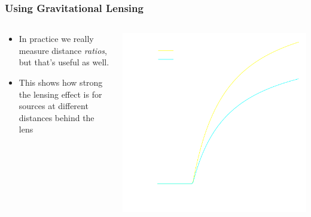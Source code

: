 \documentclass{beamer}
\begin{document}
{\begin{columns}
\begin{column}{0.5\textwidth}
            
        \end{column}
    \end{columns}


}

\frame
{

    \frametitle{Using Gravitational Lensing}


    \begin{columns}
        \begin{column}{0.5\textwidth}
            \begin{itemize}

                \item In practice we really measure distance {\em ratios}, but
                    that's useful as well.

                \item This shows how strong the lensing effect is for
                    sources at different distances behind the lens

            \end{itemize}
        \end{column}
        \begin{column}{0.5\textwidth}
            \begin{center}
                \includegraphics[width=\textwidth]{scinv-example-invert.pdf}
            \end{center}

            
        \end{column}
    \end{columns}


}
\end{document}
